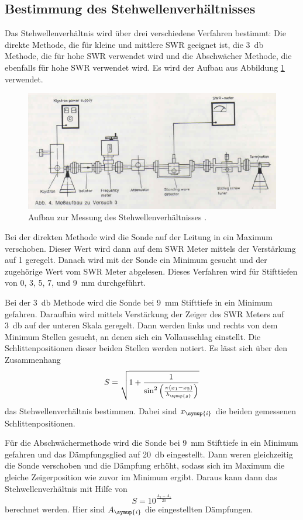 \subsection{Bestimmung des Stehwellenverhältnisses}
\label{subsec:swr}

Das Stehwellenverhältnis wird über drei verschiedene Verfahren bestimmt: Die direkte
Methode, die für kleine und mittlere SWR geeignet ist, die \SI{3}{\decibel} Methode, die für hohe
SWR verwendet wird und die Abschwächer Methode, die ebenfalls für hohe SWR verwendet
wird. Es wird der Aufbau aus Abbildung \ref{fig:aufbau_swr} verwendet.

\begin{figure}
  \centering
  \includegraphics[width=\textwidth]{data/aufbau_swr.png}
  \caption{Aufbau zur Messung des Stehwellenverhältnisses \cite{Versuchsanleitung_alt}.}
  \label{fig:aufbau_swr}
\end{figure}

Bei der
direkten Methode wird die Sonde auf der Leitung in ein Maximum verschoben. Dieser
Wert wird dann auf dem SWR Meter mittels der Verstärkung auf 1 geregelt. Danach
wird mit der Sonde ein Minimum gesucht und der zugehörige Wert vom SWR Meter
abgelesen. Dieses Verfahren wird für Stifttiefen von 0, 3, 5, 7, und \SI{9}{\milli\meter}
durchgeführt.

Bei der \SI{3}{\decibel} Methode wird die Sonde bei \SI{9}{\milli\meter} Stifttiefe in ein
Minimum gefahren. Daraufhin wird mittels Verstärkung der Zeiger des SWR Meters auf
\SI{3}{\decibel} auf der unteren Skala geregelt. Dann werden links und rechts von dem Minimum
Stellen gesucht, an denen sich ein Vollausschlag einstellt. Die Schlittenpositionen
dieser beiden Stellen werden notiert. Es lässt sich über den Zusammenhang
\begin{equation}
  S=\sqrt{1+\frac{1}{\sin^2\left(\frac{\pi(x_1-x_2)}{\lambda_{\symup{g}}}\right)}}
  \label{eqn:3dB}
\end{equation}
das Stehwellenverhältnis bestimmen. Dabei sind $x_{\symup{i}}$ die beiden gemessenen
Schlittenpositionen.

Für die Abschwächermethode wird die Sonde bei \SI{9}{\milli\meter} Stifttiefe in ein
Minimum gefahren und das Dämpfungsglied auf \SI{20}{\decibel} eingestellt. Dann
weren gleichzeitig die Sonde verschoben und die Dämpfung erhöht, sodass sich im
Maximum die gleiche Zeigerposition wie zuvor im Minimum ergibt. Daraus kann dann
das Stehwellenverhältnis mit Hilfe von
\begin{equation}
  S=10^{\frac{A_2-A_1}{20}}
  \label{eqn:abschwaecher}
\end{equation}
berechnet werden. Hier sind $A_{\symup{i}}$ die eingestellten Dämpfungen.
